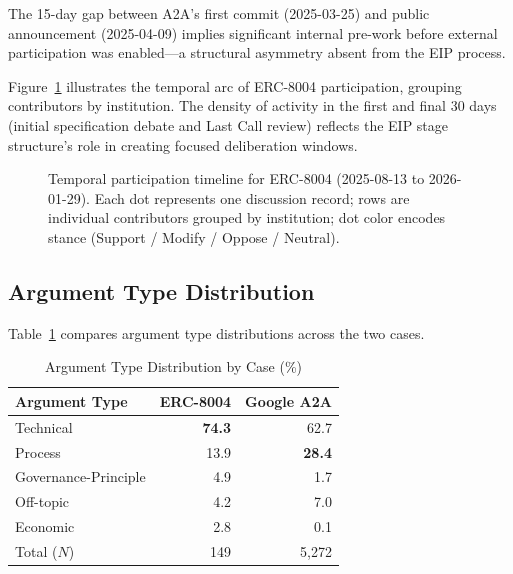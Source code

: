 \documentclass[conference]{IEEEtran}
\begin{document}
The 15-day gap between A2A's first commit (2025-03-25) and public
announcement (2025-04-09) implies significant internal pre-work before
external participation was enabled---a structural asymmetry absent from
the EIP process.

Figure~\ref{fig:timeline} illustrates the temporal arc of ERC-8004 participation,
grouping contributors by institution. The density of activity in the first and
final 30 days (initial specification debate and Last Call review) reflects the
EIP stage structure's role in creating focused deliberation windows.

\begin{figure}[htbp]
  \centering
  \caption{Temporal participation timeline for ERC-8004 (2025-08-13 to 2026-01-29).
  Each dot represents one discussion record; rows are individual contributors grouped
  by institution; dot color encodes stance (Support / Modify / Oppose / Neutral).}
  \label{fig:timeline}
\end{figure}

\subsection{Argument Type Distribution}

Table~\ref{tab:arguments} compares argument type distributions across
the two cases.

\begin{table}[h]
\caption{Argument Type Distribution by Case (\%)}
\label{tab:arguments}
\centering
\begin{tabular}{lrr}
\toprule
\textbf{Argument Type} & \textbf{ERC-8004} & \textbf{Google A2A} \\
\midrule
Technical          & \textbf{74.3} & 62.7 \\
Process            & 13.9 & \textbf{28.4} \\
Governance-Principle & 4.9 & 1.7 \\
Off-topic          & 4.2 & 7.0 \\
Economic           & 2.8 & 0.1 \\
\midrule
Total ($N$)        & 149 & 5,272 \\
\bottomrule
\end{tabular}
\end{table}
\end{document}

